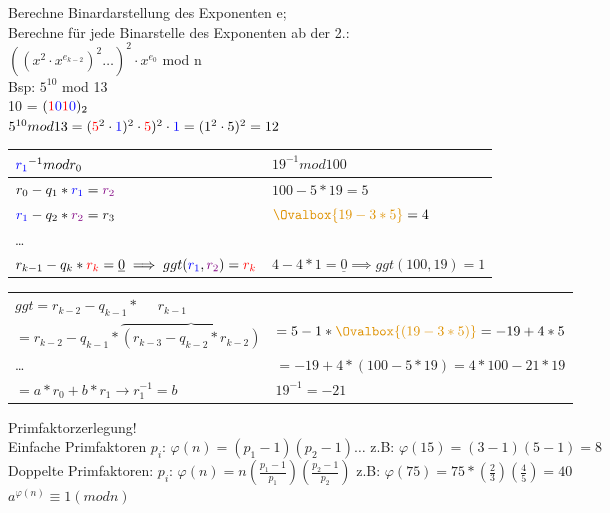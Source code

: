 Berechne Binardarstellung des Exponenten e;  \\
Berechne für jede Binarstelle des Exponenten ab der 2.:\\
$( (x^2 \cdot x^{e_{k-2}})^2 \dots )^2 \cdot x^{e_0}$ mod n\\

Bsp: $5^{10}$ mod 13\\
\newcommand{\I}{\textcolor{red}{1}}
\newcommand{\zero}{\textcolor{blue}{0}}
10 = $(\I\zero\I\zero)_2$		\\
$5^{10} mod 13 = (\textcolor{red}{5}^2 \cdot \textcolor{blue}{1})^2 \cdot \textcolor{red}{5})^2 \cdot \textcolor{blue}{1} = (1^2  \cdot 5)^2  = 12$




\minisec{\Euklid}
\newcommand{\rone}{\textcolor{blue}{r_1}}
\newcommand{\rto}{\textcolor{violet}{r_2}}
\newcommand{\rk}{\textcolor{red}{r_k}}
\begin {tabular}{ll}
$\rone^{-1} mod r_0 $ & $ 19^{-1} mod 100$ \\
\hline
$r_0 - q_1 * \rone = \rto		$	&	$	100 - 5 * 19 = 5$\\
$\rone - q_2 * \rto = r_3		$	&	$	\textcolor{darkorange}{ \Ovalbox{19 - 3 * 5}} = 4	$\\
\dots							&  	\textcolor{darkgreen}{\Ovalbox{$	5 - 1*4	= 1$}} \\
$r_{k-1} - q_k * \rk = \underline{0}\implies ggt(\rone,\rto)= \rk	$ &	  $4 - 4*1 = \underline{0} \implies ggt(100,19)=1$   \\
\end{tabular}
\begin {tabular}{ll}
$ggt = r_{k-2} - q_{k-1} * ~~~~~~r_{k-1}				$		&	\textcolor{darkgreen}{\Ovalbox{$1= 5-1* \textcolor{darkorange}{ \Ovalbox{4}}$}}\\
$= r_{k-2} - q_{k-1}* \overbrace{( r_{k-3} - q_{k-2} * r_{k-2})}$	&	$ = 5-1* \textcolor{darkorange}{ \Ovalbox{(19 - 3 * 5)}}= - 19 +4 * 5$\\
			\dots								&		$ = -19 + 4* (100 - 5 * 19) = 4*100 -21 * 19 $\\
$	= a* r_0 +b * r_1  \rightarrow r_1^{-1} = b$ &$ 	19^{-1} = -21							$\\
\end{tabular}


 

Primfaktorzerlegung!\\
Einfache Primfaktoren $p_i$: $\varphi(n) = (p_1-1)(p_2-1)\dots $ z.B:  $\varphi(15) = (3-1)(5-1)=8$\\
Doppelte Primfaktoren: $p_i$: $\varphi(n) = n(\frac{p_1-1}{p_1})(\frac{p_2-1}{p_2})$ z.B: $\varphi(75) = 75*(\frac{2}{3})(\frac{4}{5}) = 40$\\
$a^{\varphi(n)}\equiv 1 (mod n)$




